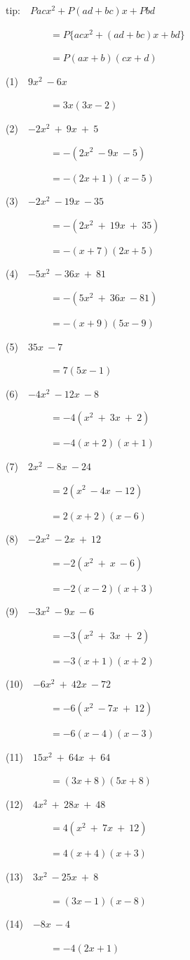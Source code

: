\documentclass[a4j,twocolumn,10pt,fleqn]{jarticle}
\begin{document}
tip:~~$Pacx^2 + P(ad + bc)x + Pbd$

~~~~~~~~~$= P\{acx^2 + (ad + bc)x +bd\}$

~~~~~~~~~$= P(ax + b)(cx + d)$

(1)~~$9x^2~-6x$

~~~~~~~~~$=3x(3x-2)$

(2)~~$-2x^2~+~9x~+~5$

~~~~~~~~~$=-(2x^2~-9x~-5)$

~~~~~~~~~$=-(2x+1)(x-5)$

(3)~~$-2x^2~-19x~-35$

~~~~~~~~~$=-(2x^2~+~19x~+~35)$

~~~~~~~~~$=-(x+7)(2x+5)$

(4)~~$-5x^2~-36x~+~81$

~~~~~~~~~$=-(5x^2~+~36x~-81)$

~~~~~~~~~$=-(x+9)(5x-9)$

(5)~~$35x~-7$

~~~~~~~~~$=7(5x-1)$

(6)~~$-4x^2~-12x~-8$

~~~~~~~~~$=-4(x^2~+~3x~+~2)$

~~~~~~~~~$=-4(x+2)(x+1)$

(7)~~$2x^2~-8x~-24$

~~~~~~~~~$=2(x^2~-4x~-12)$

~~~~~~~~~$=2(x+2)(x-6)$

(8)~~$-2x^2~-2x~+~12$

~~~~~~~~~$=-2(x^2~+~x~-6)$

~~~~~~~~~$=-2(x-2)(x+3)$

(9)~~$-3x^2~-9x~-6$

~~~~~~~~~$=-3(x^2~+~3x~+~2)$

~~~~~~~~~$=-3(x+1)(x+2)$

(10)~~$-6x^2~+~42x~-72$

~~~~~~~~~$=-6(x^2~-7x~+~12)$

~~~~~~~~~$=-6(x-4)(x-3)$

(11)~~$15x^2~+~64x~+~64$

~~~~~~~~~$=(3x+8)(5x+8)$

(12)~~$4x^2~+~28x~+~48$

~~~~~~~~~$=4(x^2~+~7x~+~12)$

~~~~~~~~~$=4(x+4)(x+3)$

(13)~~$3x^2~-25x~+~8$

~~~~~~~~~$=(3x-1)(x-8)$

(14)~~$-8x~-4$

~~~~~~~~~$=-4(2x+1)$
\end{document}
